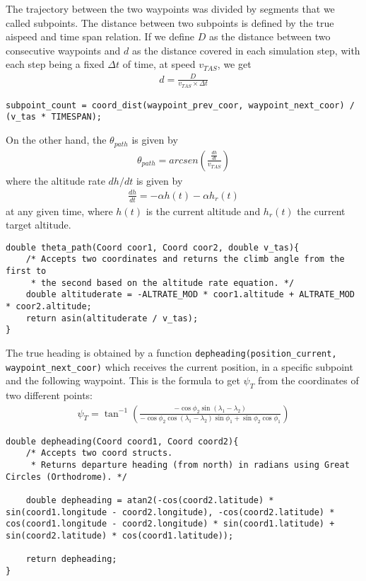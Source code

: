 \documentclass{article}
\begin{document}
The trajectory between the two waypoints was divided by segments that we called subpoints. The distance between two subpoints is defined by the true aispeed and time span relation. If we define $D$ as the distance between two consecutive waypoints and $d$ as the distance covered in each simulation step, with each step being a fixed $\Delta t$ of time, at speed $v_{TAS}$, we get
\begin{gather*}
    d = \frac{D}{v_{TAS} \times \Delta t}
\end{gather*}
\begin{verbatim}
subpoint_count = coord_dist(waypoint_prev_coor, waypoint_next_coor) / (v_tas * TIMESPAN);
\end{verbatim}
On the other hand, the $\theta_{path}$ is given by
\begin{gather*}
    \theta_{path} = arcsen\left(\frac{\frac{dh}{dt}}{v_{TAS}}\right)
\end{gather*}
where the altitude rate $dh/dt$ is given by
\begin{gather*}
    \frac{dh}{dt}=-\alpha h(t) - \alpha h_r(t)
\end{gather*}
at any given time, where $h(t)$ is the current altitude and $h_r(t)$ the current target altitude.

\begin{verbatim}
double theta_path(Coord coor1, Coord coor2, double v_tas){
    /* Accepts two coordinates and returns the climb angle from the first to
     * the second based on the altitude rate equation. */
    double altituderate = -ALTRATE_MOD * coor1.altitude + ALTRATE_MOD * coor2.altitude;
    return asin(altituderate / v_tas);
}
\end{verbatim}

The true heading is obtained by a function \texttt{depheading(position_current, waypoint_next_coor)} which receives the current position, in a specific subpoint and the following waypoint. This is the formula to get $\psi_T$ from the coordinates of two different points: 
\begin{gather*}
    \psi_T = \tan^{-1}\left(\frac{-\cos\phi_2\sin(\lambda_1 - \lambda_2)}{-\cos\phi_2\cos(\lambda_1 - \lambda_2)\sin\phi_1 + \sin\phi_2\cos\phi_1}\right)
\end{gather*} 

\begin{verbatim}
double depheading(Coord coord1, Coord coord2){
    /* Accepts two coord structs.
     * Returns departure heading (from north) in radians using Great Circles (Orthodrome). */
    
    double depheading = atan2(-cos(coord2.latitude) * sin(coord1.longitude - coord2.longitude), -cos(coord2.latitude) * cos(coord1.longitude - coord2.longitude) * sin(coord1.latitude) + sin(coord2.latitude) * cos(coord1.latitude));
    
    return depheading;
}
\end{verbatim}
\end{document}
